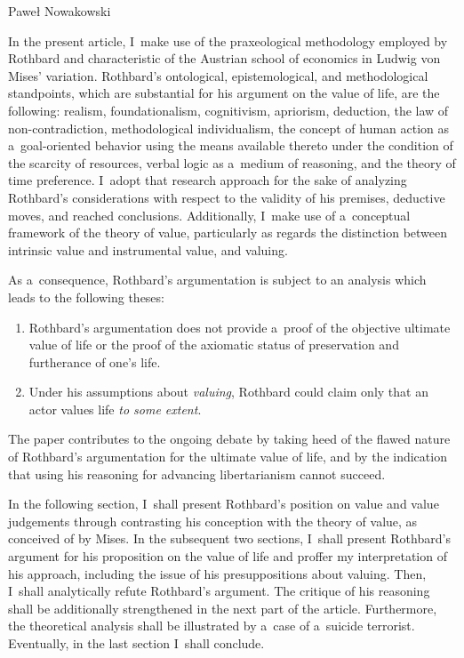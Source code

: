 \begin{artengenv}{Paweł Nowakowski}
\enlargethispage{1.5\baselineskip}

In the present article, I~make use of the praxeological methodology employed by Rothbard and characteristic of the Austrian school of economics in Ludwig von Mises' variation. Rothbard's ontological, epistemological, and methodological standpoints, which are substantial for his argument on the value of life, are the following: realism, foundationalism, cognitivism, apriorism, deduction, the law of non-contradiction, methodological individualism, the concept of human action as a~goal-oriented behavior using the means available thereto under the condition of the scarcity of resources, verbal logic as a~medium of reasoning, and the theory of time preference. I~adopt that research approach for the sake of analyzing Rothbard's considerations with respect to the validity of his premises, deductive moves, and reached conclusions. Additionally, I~make use of a~conceptual framework of the theory of value, particularly as regards the distinction between intrinsic value and instrumental value, and valuing.



As a~consequence, Rothbard's argumentation is subject to an analysis which leads to the following theses:

\begin{enumerate}[label=\arabic*)]
\item  Rothbard's argumentation does not provide a~proof of the objective ultimate value of life or the proof of the axiomatic status of preservation and furtherance of one's life.
\item Under his assumptions about \textit{valuing}, Rothbard could claim only that an actor values life \textit{to some extent}.
\end{enumerate}

The paper contributes to the ongoing debate by taking heed of the flawed nature of Rothbard's argumentation for the ultimate value of life, and by the indication that using his reasoning for advancing libertarianism cannot succeed.



In the following section, I~shall present Rothbard's position on value and value judgements through contrasting his conception with the theory of value, as conceived of by Mises. In the subsequent two sections, I~shall present Rothbard's argument for his proposition on the value of life and proffer my interpretation of his approach, including the issue of his presuppositions about valuing. Then, I~shall analytically refute Rothbard's argument. The critique of his reasoning shall be additionally strengthened in the next part of the article. Furthermore, the theoretical analysis shall be illustrated by a~case of a~suicide terrorist. Eventually, in the last section I~shall conclude.
\enlargethispage{2.5\baselineskip}



\end{artengenv}
